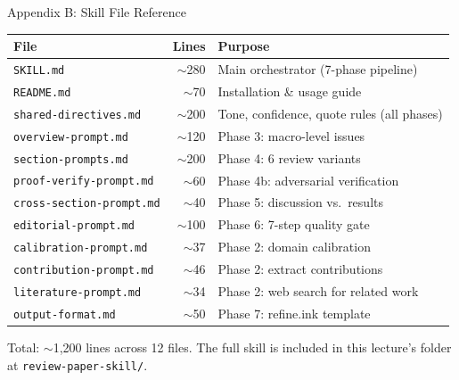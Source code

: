 \documentclass[10pt,english,aspectratio=169]{beamer}
\begin{document}
\begin{frame}{Appendix B: Skill File Reference}

\begin{small}
\begin{tabular}{lrl}
\toprule
\textbf{File} & \textbf{Lines} & \textbf{Purpose} \\
\midrule
\texttt{SKILL.md} & $\sim$280 & Main orchestrator (7-phase pipeline) \\
\texttt{README.md} & $\sim$70 & Installation \& usage guide \\
\texttt{shared-directives.md} & $\sim$200 & Tone, confidence, quote rules (all phases) \\
\texttt{overview-prompt.md} & $\sim$120 & Phase 3: macro-level issues \\
\texttt{section-prompts.md} & $\sim$200 & Phase 4: 6 review variants \\
\texttt{proof-verify-prompt.md} & $\sim$60 & Phase 4b: adversarial verification \\
\texttt{cross-section-prompt.md} & $\sim$40 & Phase 5: discussion vs.\ results \\
\texttt{editorial-prompt.md} & $\sim$100 & Phase 6: 7-step quality gate \\
\texttt{calibration-prompt.md} & $\sim$37 & Phase 2: domain calibration \\
\texttt{contribution-prompt.md} & $\sim$46 & Phase 2: extract contributions \\
\texttt{literature-prompt.md} & $\sim$34 & Phase 2: web search for related work \\
\texttt{output-format.md} & $\sim$50 & Phase 7: refine.ink template \\
\bottomrule
\end{tabular}
\end{small}

\vspace{0.2cm}
Total: $\sim$1,200 lines across 12 files. The full skill is included in this lecture's folder at \texttt{review-paper-skill/}.

\end{frame}
\end{document}
